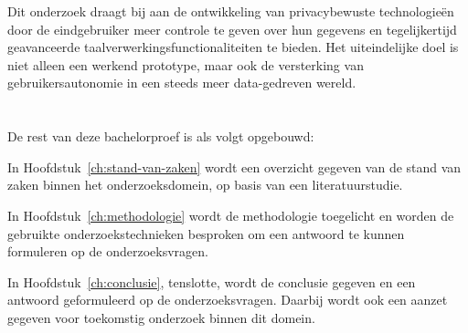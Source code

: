 Dit onderzoek draagt bij aan de ontwikkeling van privacybewuste technologieën door de eindgebruiker meer controle te geven over hun gegevens en tegelijkertijd geavanceerde taalverwerkingsfunctionaliteiten te bieden. Het uiteindelijke doel is niet alleen een werkend prototype, maar ook de versterking van gebruikersautonomie in een steeds meer data-gedreven wereld.

\section{}%
\label{sec:opzet-bachelorproef}


De rest van deze bachelorproef is als volgt opgebouwd:

In Hoofdstuk~\ref{ch:stand-van-zaken} wordt een overzicht gegeven van de stand van zaken binnen het onderzoeksdomein, op basis van een literatuurstudie.

In Hoofdstuk~\ref{ch:methodologie} wordt de methodologie toegelicht en worden de gebruikte onderzoekstechnieken besproken om een antwoord te kunnen formuleren op de onderzoeksvragen.


In Hoofdstuk~\ref{ch:conclusie}, tenslotte, wordt de conclusie gegeven en een antwoord geformuleerd op de onderzoeksvragen. Daarbij wordt ook een aanzet gegeven voor toekomstig onderzoek binnen dit domein.